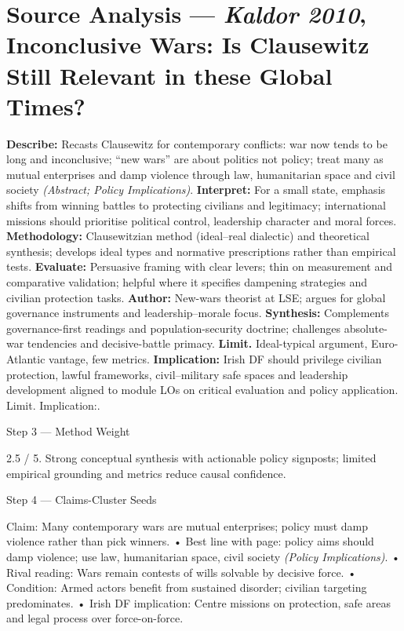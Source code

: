 \section*{Source Analysis — \textit{Kaldor 2010}, Inconclusive Wars: Is Clausewitz Still Relevant in these Global Times?}
\textbf{Describe:} Recasts Clausewitz for contemporary conflicts: war now tends to be long and inconclusive; “new wars” are about politics not policy; treat many as mutual enterprises and damp violence through law, humanitarian space and civil society \emph{(Abstract; Policy Implications)}.
\textbf{Interpret:} For a small state, emphasis shifts from winning battles to protecting civilians and legitimacy; international missions should prioritise political control, leadership character and moral forces.
\textbf{Methodology:} Clausewitzian method (ideal–real dialectic) and theoretical synthesis; develops ideal types and normative prescriptions rather than empirical tests.
\textbf{Evaluate:} Persuasive framing with clear levers; thin on measurement and comparative validation; helpful where it specifies dampening strategies and civilian protection tasks.
\textbf{Author:} New-wars theorist at LSE; argues for global governance instruments and leadership–morale focus.
\textbf{Synthesis:} Complements governance-first readings and population-security doctrine; challenges absolute-war tendencies and decisive-battle primacy.
\textbf{Limit.} Ideal-typical argument, Euro-Atlantic vantage, few metrics. \textbf{Implication:} Irish DF should privilege civilian protection, lawful frameworks, civil–military safe spaces and leadership development aligned to module LOs on critical evaluation and policy application. Limit. Implication:.

Step 3 — Method Weight

2.5 / 5. Strong conceptual synthesis with actionable policy signposts; limited empirical grounding and metrics reduce causal confidence.

Step 4 — Claims-Cluster Seeds

Claim: Many contemporary wars are mutual enterprises; policy must damp violence rather than pick winners.
• Best line with page: policy aims should damp violence; use law, humanitarian space, civil society \emph{(Policy Implications)}.
• Rival reading: Wars remain contests of wills solvable by decisive force.
• Condition: Armed actors benefit from sustained disorder; civilian targeting predominates.
• Irish DF implication: Centre missions on protection, safe areas and legal process over force-on-force.

